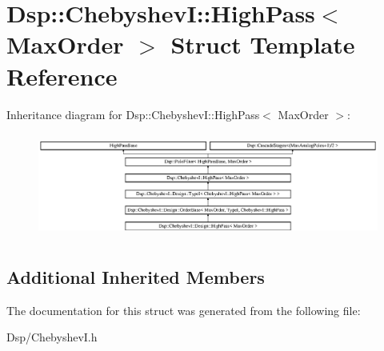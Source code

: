 \hypertarget{structDsp_1_1ChebyshevI_1_1HighPass}{\section{Dsp\-:\-:Chebyshev\-I\-:\-:High\-Pass$<$ Max\-Order $>$ Struct Template Reference}
\label{structDsp_1_1ChebyshevI_1_1HighPass}
}
Inheritance diagram for Dsp\-:\-:Chebyshev\-I\-:\-:High\-Pass$<$ Max\-Order $>$\-:\begin{figure}[H]
\begin{center}
\leavevmode
\includegraphics[height=3.463917cm]{structDsp_1_1ChebyshevI_1_1HighPass}
\end{center}
\end{figure}
\subsection*{Additional Inherited Members}


The documentation for this struct was generated from the following file\-:\begin{DoxyCompactItemize}
\item 
Dsp/Chebyshev\-I.\-h\end{DoxyCompactItemize}
